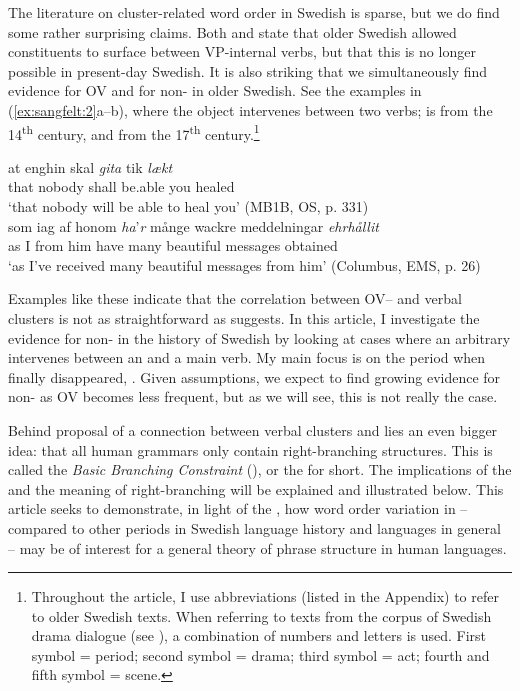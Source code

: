 \documentclass[output=paper, colorlinks, citecolor=brown]{langscibook}
\begin{document}
The literature on cluster-related word order in Swedish is sparse, but we do find some rather surprising claims. Both \citet[171–172]{Falk1993} and \citet[157]{Petzell2011} state that older Swedish allowed constituents to surface between VP-internal verbs, but that this is no longer possible in present-day Swedish. It is also striking that we simultaneously find evidence for OV and for non- in older Swedish. See the examples in (\ref{ex:sangfelt:2}a–b), where the object intervenes between two verbs;  is from the 14\textsuperscript{th} century, and  from the 17\textsuperscript{th} century.\footnote{Throughout the article, I use abbreviations (listed in the Appendix) to refer to older Swedish texts. When referring to texts from the corpus of Swedish drama dialogue (see ), a combination of numbers and letters is used. First symbol = period; second symbol = drama; third symbol = act; fourth and fifth symbol = scene.}


\ea
\label{ex:sangfelt:2}
\ea\label{ex:sangfelt:2a}
\gll at enghin skal \textit{gita} {tik} \textit{lækt} \\
that nobody shall be.able you healed\\
\glt ‘that nobody will be able to heal you’ (MB1B, OS, p. 331)\\

\ex \label{ex:sangfelt:2b}
\gll som iag af honom \textit{ha}’\textit{r} {månge} {wackre} {meddelningar} \textit{ehrhållit}\\
 as I from him have many beautiful messages obtained \\
\glt ‘as I’ve received many beautiful messages from him’ (Columbus, EMS, p. 26)\\
\z
\z


Examples like these indicate that the correlation between OV– and verbal clusters is not as straightforward as \citet{Haider2010} suggests. In this article, I investigate the evidence for non- in the history of Swedish by looking at cases where an arbitrary  intervenes between an  and a main verb. My main focus is on the period when  finally disappeared, . Given  assumptions, we expect to find growing evidence for non- as OV becomes less frequent, but as we will see, this is not really the case.


Behind  proposal of a connection between verbal clusters and  lies an even bigger idea: that all human grammars only contain right-branching structures. This is called the \textit{Basic Branching Constraint} (\citealt{Haider2010, Haider2013}), or the  for short. The implications of the  and the meaning of right-branching will be explained and illustrated below. This article seeks to demonstrate, in light of the , how  word order variation in  – compared to other periods in Swedish language history and  languages in general – may be of interest for a general theory of phrase structure in human languages.
\end{document}

